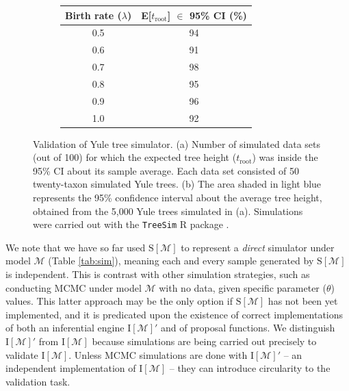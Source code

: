 \documentclass[oneside]{article}
\begin{document}
\begin{figure}
  \centering
  \vspace{0pt}
  \begin{subfigure}[t]{0.5\textwidth}
    \caption{}
    \centering
    \begin{tabular}{ c|c }
    \hline
    Birth rate ($\lambda$) & E[$t_{\text{root}}$] $\in$ 95\% CI (\%)\\
    \hline  
    0.5 & 94\\
    0.6 & 91\\
    0.7 & 98\\
    0.8 & 95\\
    0.9 & 96\\
    1.0 & 92\\
    \hline
  \end{tabular}
  \end{subfigure}
  \vspace{0pt}
  \hspace{1cm}
  \begin{subfigure}[t]{0.4\textwidth}
    \caption{}
    \centering
        
  \end{subfigure}
  \hfill
  \caption{Validation of Yule tree simulator.
    (a) Number of simulated data sets (out of 100) for which the
    expected tree height ($t_{\text{root}}$) was inside the 95\% CI
    about its sample average.
    Each data set consisted of 50 twenty-taxon simulated Yule trees.
    (b) The area shaded in light blue represents the
    95\% confidence interval about the average tree height, obtained
    from the 5,000 Yule trees simulated in (a). Simulations were
    carried out with the \texttt{TreeSim} R package \citep{stadler11}.}
  \label{fig:yulemean}
\end{figure}

We note that we have so far used $\text{S}[\mathcal{M}]$ to represent a \emph{direct} simulator under model $\mathcal{M}$ (Table \ref{tab:sim}), meaning each and every sample generated by $\text{S}[\mathcal{M}]$ is independent.
This is contrast with other simulation strategies, such as conducting MCMC under model $\mathcal{M}$ with no data, given specific parameter ($\theta$) values.
This latter approach may be the only option if $\text{S}[\mathcal{M}]$ has not been yet implemented, and it is predicated upon the existence of correct implementations of both an inferential engine $\text{I}[\mathcal{M}]'$ and of proposal functions.
We distinguish $\text{I}[\mathcal{M}]'$ from $\text{I}[\mathcal{M}]$ because simulations are being carried out precisely to validate $\text{I}[\mathcal{M}]$.
Unless MCMC simulations are done with $\text{I}[\mathcal{M}]'$ -- an independent implementation of $\text{I}[\mathcal{M}]$ -- they can introduce circularity to the validation task.
\end{document}
